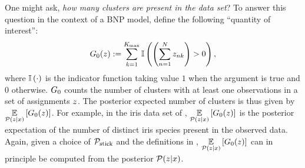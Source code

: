 \begin{ex}

One might ask, \textit{how many clusters are present in the data set}? To answer
this question in the context of a BNP model, define the
following ``quantity of interest'':
%
\begin{align*}
  G_0(z) := \sum_{k=1}^{K_{\mathrm{max}}} \mathbb{I}\left( \left(\sum_{n=1}^{N}
  z_{nk}\right) > 0\right),
\end{align*}
%
where $\mathbb{I}\left(\cdot\right)$ is the indicator function taking value $1$ when the argument
is true and $0$ otherwise. $G_0$ counts the number of clusters with at
least one observations in a set of assignments $z$.  The posterior expected
number of clusters is thus given by $\underset{\mathcal{P}(z\vert x)}{\mathbb{E}}\left[G_0(z)\right]$.
For example, in the iris data set of ,
$\underset{\mathcal{P}(z\vert x)}{\mathbb{E}}\left[G_0(z)\right]$ is the posterior expectation of the
number of distinct iris species present in the observed data.
%
Again, given a choice of $\mathcal{P}_{\mathrm{stick}}$ and the definitions in
, $\underset{\mathcal{P}(z\vert x)}{\mathbb{E}}\left[G_0(z)\right]$ can in
principle be computed from the posterior $\mathcal{P}(z \vert x)$.
%
\end{ex}

